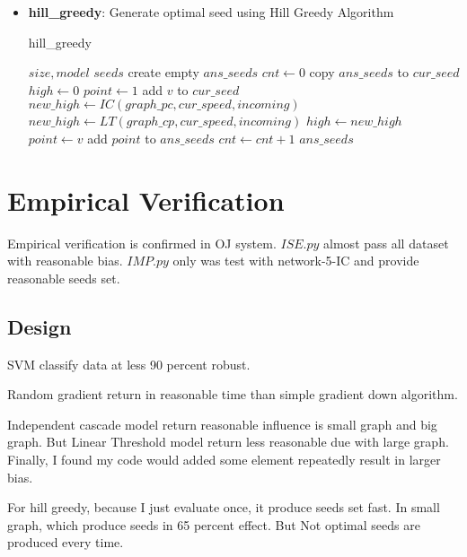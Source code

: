 \documentclass[conference,compsoc]{IEEEtran}
\renewcommand{\algorithmicrequire}{\textbf{Input:}}
\renewcommand{\algorithmicensure}{\textbf{Output:}}
\begin{document}
\begin{itemize}
 \item \textbf{hill\_greedy}: Generate optimal seed using Hill Greedy Algorithm
     \begin{algorithm}[H]
     \caption{hill\_greedy}
     \begin{algorithmic}[4]
     \renewcommand{\algorithmicrequire}{\textbf{Input:}}
     \renewcommand{\algorithmicensure}{\textbf{Output:}}
     \REQUIRE $size, model$
     \ENSURE  $seeds$
     \STATE create empty $ans\_seeds$
     \STATE $cnt \leftarrow 0$
	\STATE copy $ans\_seeds$ to $cur\_seed$
	\STATE $high \leftarrow 0$
	\STATE $point \leftarrow 1$
	     \STATE add $v$ to $cur\_seed$
	          \STATE $new\_high \leftarrow IC(graph\_pc,cur\_speed, incoming)$ 
	     \ELSE
	          \STATE $new\_high \leftarrow LT(graph\_cp,cur\_speed, incoming)$ 
	     \ENDIF
	         \STATE $high \leftarrow new\_high$
		 \STATE $point \leftarrow v$
	     \ENDIF
        \ENDFOR
	\STATE add $point$ to $ans\_seeds$
	\STATE $cnt \leftarrow cnt+1$
     \ENDWHILE
     \RETURN $ans\_seeds$
     \end{algorithmic}
     \end{algorithm}
 

\end{itemize}


\section{Empirical Verification}
Empirical verification is confirmed in OJ system. $ISE.py$ almost pass all
dataset with reasonable bias. $IMP.py$ only was test with network-5-IC and
provide reasonable seeds set.

\subsection{Design}
SVM classify data at less 90 percent robust.

Random gradient return in reasonable time than simple gradient down algorithm.

Independent cascade model return reasonable influence is small graph and big graph.
But Linear Threshold model return less reasonable due with large graph. Finally,
I found my code would added some element repeatedly result in larger bias.

For hill greedy, because I just evaluate once, it produce seeds set fast. In
small graph, which produce seeds in 65 percent effect. But
Not optimal seeds are produced every time.
\end{document}
